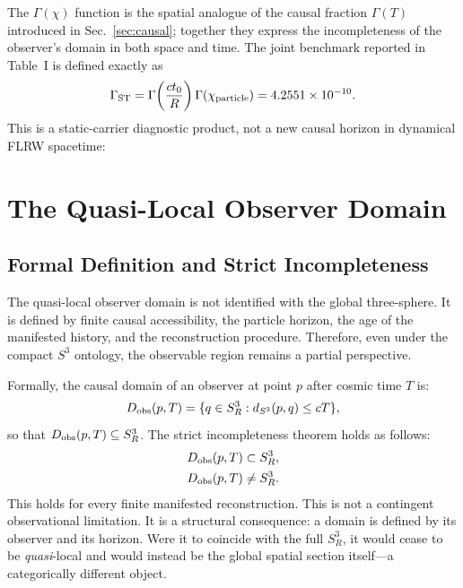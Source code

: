 \documentclass[aps,prd,onecolumn,superscriptaddress,longbibliography,nofootinbib,notitlepage]{revtex4-2}
\begin{document}
The $\Gamma(\chi)$ function is the spatial analogue of the causal fraction
$\Gamma(T)$ introduced in Sec.~\ref{sec:causal}; together they express the
incompleteness of the observer's domain in both space and time. The joint benchmark
reported in Table~I is defined exactly as
\begin{equation}
  \Gamma_{\rm ST}
  =\Gamma\!\left(\frac{ct_0}{R}\right)\Gamma(\chi_{\rm particle})
  =4.2551\times10^{-10}.
\end{equation}
This is a static-carrier diagnostic product, not a new causal horizon in dynamical
FLRW spacetime:
\begin{center}
\end{center}

\section{The Quasi-Local Observer Domain}
\label{sec:quasilocal}

\subsection{Formal Definition and Strict Incompleteness}

The quasi-local observer domain is not identified with the global three-sphere. It
is defined by finite causal accessibility, the particle horizon, the age of the
manifested history, and the reconstruction procedure. Therefore, even under the
compact $S^3$ ontology, the observable region remains a partial perspective.

Formally, the causal domain of an observer at point $p$ after cosmic time $T$ is:
\begin{equation}
  D_{\rm obs}(p,T)
  = \{q \in S^3_R : d_{S^3}(p,q) \leq cT\},
\end{equation}
so that $D_{\rm obs}(p,T) \subseteq S^3_R$. The strict incompleteness theorem
holds as follows:
\begin{equation}
\begin{aligned}
  D_{\rm obs}(p,T) &\subset S^3_R, \\
  D_{\rm obs}(p,T) &\neq S^3_R.
\end{aligned}
\end{equation}
This holds for every finite manifested reconstruction. This is not a contingent
observational limitation. It is a structural consequence: a domain is defined by
its observer and its horizon. Were it to coincide with the full $S^3_R$, it would
cease to be \emph{quasi}-local and would instead be the global spatial section
itself---a categorically different object.
\end{document}
